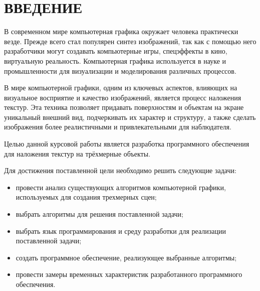 \section*{\centering ВВЕДЕНИЕ}

В современном мире компьютерная графика окружает человека практически везде.
Прежде всего стал популярен синтез изображений, так как с помощью него разработчики могут создавать компьютерные игры, спецэффекты в кино, виртуальную реальность. Компьютерная графика используется в науке и промышленности для визуализации и
моделирования различных процессов.

В мире компьютерной графики, одним из ключевых аспектов, влияющих на визуальное восприятие и качество изображений, является процесс наложения текстур.
Эта техника позволяет придавать поверхностям и объектам на экране уникальный внешний вид, подчеркивать их характер и структуру, а также сделать изображения более реалистичными и привлекательными для наблюдателя.

Целью данной курсовой работы является разработка программного обеспечения для наложения текстур на трёхмерные объекты.

Для достижения поставленной цели необходимо решить следующие задачи:
\begin{itemize}
	\item провести анализ существующих алгоритмов компьютерной графики, используемых для создания трехмерных сцен;
	\item выбрать алгоритмы для решения поставленной задачи;
	\item выбрать язык программирования и среду разработки для реализации поставленной задачи;
	\item создать программное обеспечение, реализующее выбранные алгоритмы;
	\item провести замеры временных характеристик разработанного программного обеспечения.  
\end{itemize}